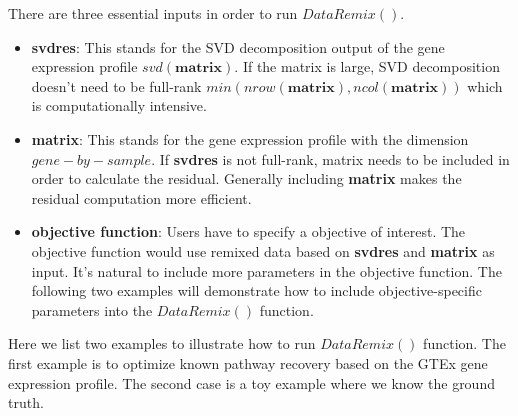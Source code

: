 \documentclass{article}
\begin{document}


There are three essential inputs in order to run $DataRemix()$.

\begin{itemize}
\item \textbf{svdres}: This stands for the SVD decomposition output of the gene expression profile $svd(\textbf{matrix})$. If the matrix is large, SVD decomposition doesn't need to be full-rank $min(nrow(\textbf{matrix}), ncol(\textbf{matrix}))$ which is computationally intensive.
\item \textbf{matrix}: This stands for the gene expression profile with the dimension $gene-by-sample$. If \textbf{svdres} is not full-rank, matrix needs to be included in order to calculate the residual. Generally including \textbf{matrix} makes the residual computation more efficient.
\item \textbf{objective function}: Users have to specify a objective of interest. The objective function would use remixed data based on \textbf{svdres} and \textbf{matrix} as input. It's natural to include more parameters in the objective function. The following two examples will demonstrate how to include objective-specific parameters into the $DataRemix()$ function.
\end{itemize}

Here we list two examples to illustrate how to run $DataRemix()$ function. The first example is to optimize known pathway recovery based on the GTEx gene expression profile. The second case is a toy example where we know the ground truth.
\end{document}
